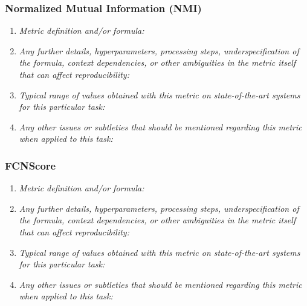 \documentclass[a4paper,11pt]{article}
\begin{document}
        \subsubsection{Normalized Mutual Information (NMI)}
            \begin{enumerate}[label=\alph*.]
                \item \textit{Metric definition and/or formula:}
                \bigskip
                \item \textit{Any further details, hyperparameters, processing steps, underspecification of the formula, context dependencies, or other ambiguities in the metric itself that can affect reproducibility:}
                \bigskip
                \item \textit{Typical range of values obtained with this metric on state-of-the-art systems for this particular task:}
                \bigskip
                \item \textit{Any other issues or subtleties that should be mentioned regarding this metric when applied to this task:}
                \bigskip
            \end{enumerate}

        \subsubsection{FCNScore}
            \begin{enumerate}[label=\alph*.]
                \item \textit{Metric definition and/or formula:}
                \bigskip
                \item \textit{Any further details, hyperparameters, processing steps, underspecification of the formula, context dependencies, or other ambiguities in the metric itself that can affect reproducibility:}
                \bigskip
                \item \textit{Typical range of values obtained with this metric on state-of-the-art systems for this particular task:}
                \bigskip
                \item \textit{Any other issues or subtleties that should be mentioned regarding this metric when applied to this task:}
                \bigskip
            \end{enumerate}
\end{document}
